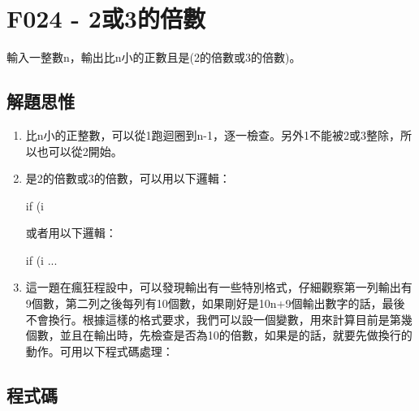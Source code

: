 \section{F024 - 2或3的倍數}
輸入一整數n，輸出比n小的正數且是(2的倍數或3的倍數)。
\subsection{解題思惟}
\begin{enumerate}
	\item 比n小的正整數，可以從1跑迴圈到n-1，逐一檢查。另外1不能被2或3整除，所以也可以從2開始。
	\item 是2的倍數或3的倍數，可以用以下邏輯：
	\begin{inside}
		if (i%
	\end{inside}
	或者用以下邏輯：
	\begin{inside}
		if (i%
		...
	\end{inside}
	\item 這一題在瘋狂程設中，可以發現輸出有一些特別格式，仔細觀察第一列輸出有9個數，第二列之後每列有10個數，如果剛好是10n+9個輸出數字的話，最後不會換行。根據這樣的格式要求，我們可以設一個變數，用來計算目前是第幾個數，並且在輸出時，先檢查是否為10的倍數，如果是的話，就要先做換行的動作。可用以下程式碼處理：
\end{enumerate}
\subsection{程式碼}

